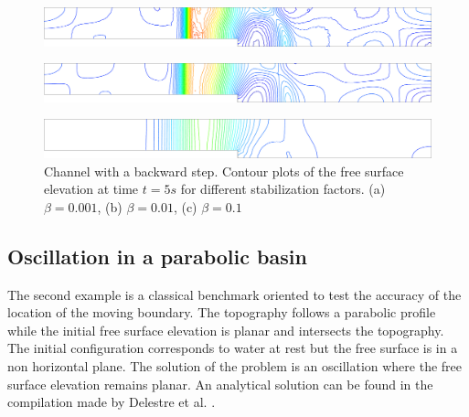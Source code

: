 \documentclass[a4paper,12pt]{elsarticle}
\begin{document}
\begin{figure}[H]
    \begin{subfigure}{.05\textwidth}
        \caption{}
    \end{subfigure}
    \begin{minipage}[c]{.94\textwidth}
        \includegraphics[width=\textwidth]{img/step/stab_0.001_time_5.pdf}
    \end{minipage}
    \par\medskip
    \begin{subfigure}{.05\textwidth}
        \caption{}
    \end{subfigure}
    \begin{minipage}[c]{.94\textwidth}
        \includegraphics[width=\textwidth]{img/step/stab_0.01_time_5.pdf}
    \end{minipage}
    \par\medskip
    \begin{subfigure}{.05\textwidth}
        \caption{}
    \end{subfigure}
    \begin{minipage}[c]{.94\textwidth}
        \includegraphics[width=\textwidth]{img/step/stab_0.1_time_5.pdf}
    \end{minipage}
\caption{Channel with a backward step. Contour plots of the free surface elevation at time $t=5s$ for different stabilization factors. (a) $\beta=0.001$, (b) $\beta=0.01$, (c) $\beta=0.1$}
\label{stab_parameters_time2}
\end{figure}



\subsection{Oscillation in a parabolic basin}

The second example is a classical benchmark oriented to test the accuracy of the location of the moving boundary. The topography follows a parabolic profile while the initial free surface elevation is planar and intersects the topography. The initial configuration corresponds to water at rest but the free surface is in a non horizontal plane. The solution of the problem is an oscillation where the free surface elevation remains planar. An analytical solution can be found in the compilation made by Delestre et al. \cite{delestre2013}.
\end{document}
